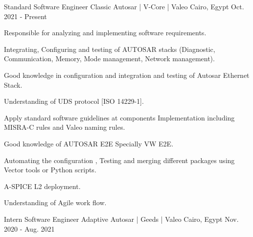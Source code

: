 

\begin{cventries}
  \cventry
    {\normalsize Standard Software Engineer} %
    {\Large Classic Autosar | V-Core | \color{green}Valeo} %
    {\normalsize Cairo, Egypt} %
    {\normalsize Oct. 2021 - Present} %
    {
      \begin{cvitems} %
        \item {\normalsize Responsible for analyzing and implementing software requirements.}
        \item {\normalsize Integrating, Configuring and testing of AUTOSAR stacks (Diagnostic, Communication, Memory, Mode management, Network management).}
        \item {\normalsize Good knowledge in configuration and integration and testing of Autosar Ethernet Stack.}
        \item {\normalsize Understanding of UDS protocol [ISO 14229-1].}
        \item {\normalsize Apply standard software guidelines at components Implementation including MISRA-C rules and Valeo naming rules.}
        \item {\normalsize Good knowledge of AUTOSAR E2E Specially VW E2E.}
        \item {\normalsize Automating the configuration , Testing and merging different packages using Vector tools or Python scripts.}
        \item{\normalsize A-SPICE L2 deployment.}
        \item {\normalsize Understanding of Agile work flow.}
      \end{cvitems}
    }
  \cventry
    {\normalsize Intern Software Engineer} %
    {\newline \Large Adaptive Autosar | Geeds | \color{green}Valeo} %
    {\normalsize Cairo, Egypt} %
    {\normalsize Nov. 2020 - Aug. 2021} %
    {
      \begin{cvitems} %

\end{cvitems}}
\end{cventries}
